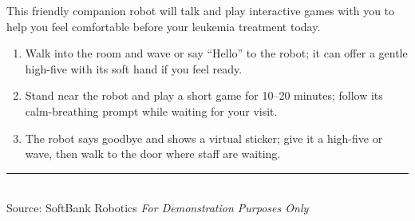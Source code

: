 \documentclass[11pt,a4paper]{article}
\begin{document}
\vspace{0.3em}
This friendly companion robot will talk and play interactive games with you to help you feel comfortable before your leukemia treatment today.

\begin{enumerate}[leftmargin=1.5em,itemsep=2pt]
  \item Walk into the room and wave or say ``Hello'' to the robot; it can offer a gentle high-five with its soft hand if you feel ready.
  \item Stand near the robot and play a short game for 10--20 minutes; follow its calm-breathing prompt while waiting for your visit.
  \item The robot says goodbye and shows a virtual sticker; give it a high-five or wave, then walk to the door where staff are waiting.
\end{enumerate}

\vfill
\noindent\rule{\textwidth}{0.4pt}\\
{\scriptsize Source: SoftBank Robotics \hfill \textit{For Demonstration Purposes Only}}
\end{document}
